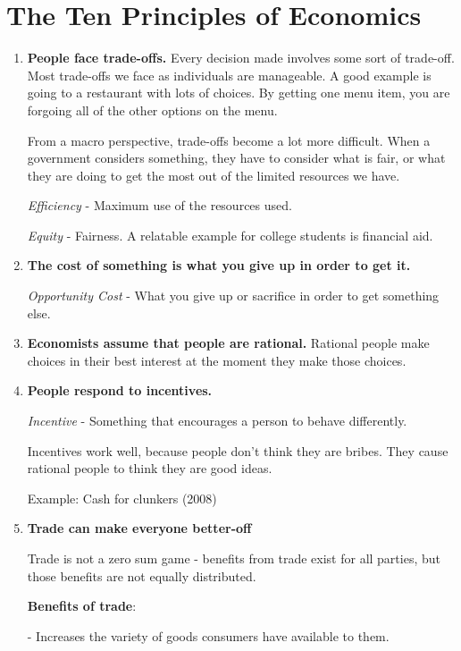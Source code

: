 \documentclass{article}
\begin{document}
\section{The Ten Principles of Economics}
\begin{enumerate}
    \item{\textbf{People face trade-offs.} Every decision made involves some sort of trade-off. Most trade-offs we face as individuals are manageable. A good example is going to a restaurant with lots of choices. By getting one menu item, you are forgoing all of the other options on the menu.
    
    From a macro perspective, trade-offs become a lot more difficult. When a government considers something, they have to consider what is fair, or what they are doing to get the most out of the limited resources we have.
    
    \textit{Efficiency} - Maximum use of the resources used.
    
    \textit{Equity} - Fairness. A relatable example for college students is financial aid.}

    \item{\textbf{The cost of something is what you give up in order to get it.}}

    \textit{Opportunity Cost} - What you give up or sacrifice in order to get something else.

    \item{\textbf{Economists assume that people are rational.} Rational people make choices in their best interest at the moment they make those choices.}

    \item{\textbf{People respond to incentives.}

    \textit{Incentive} - Something that encourages a person to behave differently.

    Incentives work well, because people don't think they are bribes. They cause rational people to think they are good ideas.

    Example: Cash for clunkers (2008)}

    \item{\textbf{Trade can make everyone better-off}

    Trade is not a zero sum game - benefits from trade exist for all parties, but those benefits are not equally distributed.

    \textbf{Benefits of trade}:
    
    - Increases the variety of goods consumers have available to them.

}
\end{enumerate}
\end{document}
